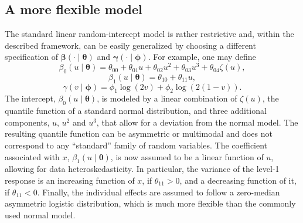 \documentclass[12pt]{article}
\def\thetavec{\bm{\theta}}
\def\phivec{\bm{\phi}}
\def\betavec{\bm{\beta}}
\def\gammavec{\bm{\gamma}}
\def\bvec{\bm{b}}
\def\cvec{\bm{c}}
\begin{document}
\subsection{A more flexible model}\label{subsec:flexmodel}
The standard linear random-intercept model is rather restrictive and, within the described framework,
can be easily generalized by choosing a different specification of $\betavec(\cdot \mid \thetavec)$ and $\gammavec(\cdot \mid \phivec)$. 
For example, one may define
$$\beta_0(u\mid\thetavec) = \theta_{00} +  \theta_{01}u + \theta_{02}u^2 + \theta_{03}u^3 + \theta_{04}\zeta(u),$$
$$\beta_1(u\mid\thetavec) = \theta_{10} + \theta_{11}u,$$
$$\gamma(v \mid\phivec) = \phi_1 \log{(2v)} + \phi_2\log{(2(1 - v))}.$$
The intercept, $\beta_0(u\mid\thetavec)$, is modeled by a linear combination of $\zeta(u)$, the quantile function of a standard normal
distribution, and three additional components, $u$, $u^2$ and $u^3$, that allow for a deviation from the normal model. The resulting quantile function
can be asymmetric or multimodal and does not correspond to any ``standard'' family of random variables. 
The coefficient associated with $x$, $\beta_1(u\mid\thetavec)$, is now assumed to be a linear function of $u$,
allowing for data heteroskedasticity. In particular, the variance of the level-1 response is an increasing function of $x$,
if $\theta_{11} > 0$, and a decreasing function of it, if $\theta_{11} < 0$. Finally, the individual effects are assumed to follow
a zero-median asymmetric logistic distribution, which is much more flexible than the commonly used normal model.
\end{document}
